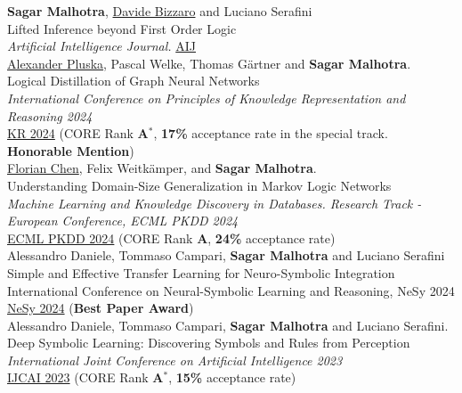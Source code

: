 \documentclass[10pt, a4paper]{article}
\newcommand{\years}[1]{\marginnote{\scriptsize #1}}
\begin{document}
\years{2025}\textbf{Sagar Malhotra}, \underline{Davide Bizzaro} and Luciano Serafini\\
Lifted Inference beyond First Order Logic \\
\emph{Artificial Intelligence Journal.} \href{https://doi.org/10.1016/j.artint.2025.104310}{AIJ}\\ 


\years{2024}\underline{Alexander Pluska}, Pascal Welke, Thomas G{\"a}rtner and \textbf{Sagar Malhotra}.\\
Logical Distillation of Graph Neural Networks\\
\emph{International Conference on Principles of Knowledge Representation and Reasoning 2024} \\
\href{https://arxiv.org/abs/2406.07126}{KR 2024} (CORE Rank \textbf{A$^{*}$}, \textbf{17\%} acceptance rate in the special track.  \textbf{Honorable Mention})\\

\years{2024}\underline{Florian Chen}, Felix Weitkämper, and \textbf{Sagar Malhotra}.\\
Understanding Domain-Size Generalization in Markov Logic Networks\\
\emph{Machine Learning and Knowledge Discovery in Databases. Research Track - European Conference, ECML PKDD 2024} \\
\href{https://arxiv.org/abs/2403.15933}{ECML PKDD 2024} (CORE Rank \textbf{A}, \textbf{24\%} acceptance rate)\\

\years{2024}Alessandro Daniele, Tommaso Campari, \textbf{Sagar Malhotra} and Luciano Serafini\\
Simple and Effective Transfer Learning for Neuro-Symbolic Integration\\
International Conference on Neural-Symbolic Learning and Reasoning, NeSy 2024\\
\href{https://arxiv.org/abs/2402.14047}{NeSy 2024} (\textbf{Best Paper Award})\\ 

\years{2023}Alessandro Daniele, Tommaso Campari, \textbf{Sagar Malhotra} and Luciano Serafini. \\ Deep Symbolic Learning: Discovering Symbols and Rules from Perception \\ 
\emph{International Joint Conference on Artificial Intelligence 2023}\\
\href{https://www.ijcai.org/proceedings/2023/400}{IJCAI 2023} (CORE Rank \textbf{A$^{*}$}, \textbf{15\%} acceptance rate)\\ 
\end{document}
